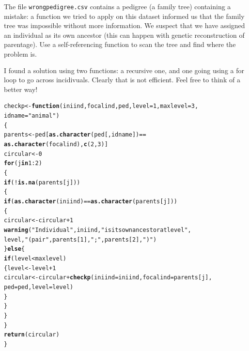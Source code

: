 \documentclass[12pt,a4paper]{scrartcl}\usepackage[]{graphicx}\usepackage[]{color}
\makeatletter
\newcommand{\hlnum}[1]{\textcolor[rgb]{0.686,0.059,0.569}{#1}}%
\newcommand{\hlstr}[1]{\textcolor[rgb]{0.192,0.494,0.8}{#1}}%
\newcommand{\hlopt}[1]{\textcolor[rgb]{0,0,0}{#1}}%
\newcommand{\hlstd}[1]{\textcolor[rgb]{0.345,0.345,0.345}{#1}}%
\newcommand{\hlkwa}[1]{\textcolor[rgb]{0.161,0.373,0.58}{\textbf{#1}}}%
\newcommand{\hlkwb}[1]{\textcolor[rgb]{0.69,0.353,0.396}{#1}}%
\newcommand{\hlkwc}[1]{\textcolor[rgb]{0.333,0.667,0.333}{#1}}%
\newcommand{\hlkwd}[1]{\textcolor[rgb]{0.737,0.353,0.396}{\textbf{#1}}}%
\newenvironment{kframe}{%
 \def\at@end@of@kframe{}%
 \ifinner\ifhmode%
  \def\at@end@of@kframe{\end{minipage}}%
  \begin{minipage}{\columnwidth}%
 \fi\fi%
 \def\FrameCommand##1{\hskip\@totalleftmargin \hskip-\fboxsep
 \colorbox{shadecolor}{##1}\hskip-\fboxsep
     \hskip-\linewidth \hskip-\@totalleftmargin \hskip\columnwidth}%
 \MakeFramed {\advance\hsize-\width
   \@totalleftmargin\z@ \linewidth\hsize
   \@setminipage}}%
 {\par\unskip\endMakeFramed%
 \at@end@of@kframe}
\newenvironment{knitrout}{}{} %
\makeatother
\begin{document}
\begin{Exercise}[difficulty=3, title={Find a mistake in a family tree}]
The file \texttt{wrongpedigree.csv} contains a pedigree (a family tree) containing a mistake: a function we tried to apply on this dataset informed us that the family tree was impossible without more information. We suspect that we have assigned an individual as its own ancestor (this can happen with genetic reconstruction of parentage). Use a self-referencing function to scan the tree and find where the problem is.
\end{Exercise}
\begin{Answer}
I found a solution using two functions: a recursive one, and one going using a for loop to go across incidivuals. Clearly that is not efficient. Feel free to think of a better way!

\begin{knitrout}
\color{fgcolor}\begin{kframe}
\begin{alltt}
\hlstd{checkp} \hlkwb{<-} \hlkwa{function}\hlstd{(}\hlkwc{iniind}\hlstd{,} \hlkwc{focalind}\hlstd{,} \hlkwc{ped}\hlstd{,} \hlkwc{level}\hlstd{=}\hlnum{1}\hlstd{,} \hlkwc{maxlevel}\hlstd{=}\hlnum{3}\hlstd{,}
                   \hlkwc{idname} \hlstd{=} \hlstr{"animal"}\hlstd{)}
\hlstd{\{}
  \hlstd{parents} \hlkwb{<-} \hlstd{ped[}\hlkwd{as.character}\hlstd{(ped[,idname])}\hlopt{==}
                   \hlkwd{as.character}\hlstd{(focalind),}\hlkwd{c}\hlstd{(}\hlnum{2}\hlstd{,}\hlnum{3}\hlstd{)]}
  \hlstd{circular} \hlkwb{<-} \hlnum{0}
  \hlkwa{for}\hlstd{(j} \hlkwa{in} \hlnum{1}\hlopt{:}\hlnum{2}\hlstd{)}
  \hlstd{\{}
    \hlkwa{if}\hlstd{(}\hlopt{!}\hlkwd{is.na}\hlstd{(parents[j]))}
    \hlstd{\{}
      \hlkwa{if}\hlstd{(}\hlkwd{as.character}\hlstd{(iniind)}\hlopt{==}\hlkwd{as.character}\hlstd{(parents[j]))}
      \hlstd{\{}
        \hlstd{circular} \hlkwb{<-} \hlstd{circular}\hlopt{+}\hlnum{1}
        \hlkwd{warning}\hlstd{(}\hlstr{"Individual"}\hlstd{, iniind,} \hlstr{" is its own ancestor at level "}\hlstd{,}
                \hlstd{level,}  \hlstr{" (pair "}\hlstd{, parents[}\hlnum{1}\hlstd{],}\hlstr{";"}\hlstd{, parents[}\hlnum{2}\hlstd{],} \hlstr{")"}\hlstd{)}
      \hlstd{\}}\hlkwa{else}\hlstd{\{}
        \hlkwa{if}\hlstd{(level}\hlopt{<}\hlstd{maxlevel)}
        \hlstd{\{level} \hlkwb{<-} \hlstd{level}\hlopt{+}\hlnum{1}
        \hlstd{circular} \hlkwb{<-} \hlstd{circular} \hlopt{+} \hlkwd{checkp}\hlstd{(}\hlkwc{iniind}\hlstd{=iniind,} \hlkwc{focalind}\hlstd{=parents[j],}
                                      \hlkwc{ped} \hlstd{= ped,} \hlkwc{level}\hlstd{=level)}
        \hlstd{\}}
      \hlstd{\}}
    \hlstd{\}}
  \hlstd{\}}
  \hlkwd{return}\hlstd{(circular)}
\hlstd{\}}
\end{alltt}
\end{kframe}
\end{knitrout}


\end{Answer}
\end{document}
